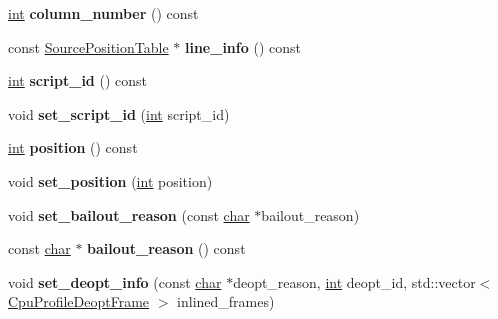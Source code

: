 \begin{DoxyCompactItemize}
\mbox{\hyperlink{classint}{int}} {\bfseries column\+\_\+number} () const
\item 
\mbox{\label{classv8_1_1internal_1_1CodeEntry_a981f5235897c2f0e2d85a2387e1d6bd6}} 
const \mbox{\hyperlink{classv8_1_1internal_1_1SourcePositionTable}{Source\+Position\+Table}} $\ast$ {\bfseries line\+\_\+info} () const
\item 
\mbox{\label{classv8_1_1internal_1_1CodeEntry_aca7316f853baf657f8ee9c4219e007ea}} 
\mbox{\hyperlink{classint}{int}} {\bfseries script\+\_\+id} () const
\item 
\mbox{\label{classv8_1_1internal_1_1CodeEntry_a52937aac42b99caaa1f5956706a6565c}} 
void {\bfseries set\+\_\+script\+\_\+id} (\mbox{\hyperlink{classint}{int}} script\+\_\+id)
\item 
\mbox{\label{classv8_1_1internal_1_1CodeEntry_a697e1a31e0470fe2c6d5915b4bedb5bc}} 
\mbox{\hyperlink{classint}{int}} {\bfseries position} () const
\item 
\mbox{\label{classv8_1_1internal_1_1CodeEntry_a80a9e85cbb2d54e7ed6bee8184d014d0}} 
void {\bfseries set\+\_\+position} (\mbox{\hyperlink{classint}{int}} position)
\item 
\mbox{\label{classv8_1_1internal_1_1CodeEntry_a6c5b09de8c11f72b63c95f086bddb489}} 
void {\bfseries set\+\_\+bailout\+\_\+reason} (const \mbox{\hyperlink{classchar}{char}} $\ast$bailout\+\_\+reason)
\item 
\mbox{\label{classv8_1_1internal_1_1CodeEntry_aa6c254b7e544a1d111d7d85834d7cb56}} 
const \mbox{\hyperlink{classchar}{char}} $\ast$ {\bfseries bailout\+\_\+reason} () const
\item 
\mbox{\label{classv8_1_1internal_1_1CodeEntry_ac50d387f1a95bf810ae33613f18648b6}} 
void {\bfseries set\+\_\+deopt\+\_\+info} (const \mbox{\hyperlink{classchar}{char}} $\ast$deopt\+\_\+reason, \mbox{\hyperlink{classint}{int}} deopt\+\_\+id, std\+::vector$<$ \mbox{\hyperlink{structv8_1_1CpuProfileDeoptFrame}{Cpu\+Profile\+Deopt\+Frame}} $>$ inlined\+\_\+frames)

\end{DoxyCompactItemize}
